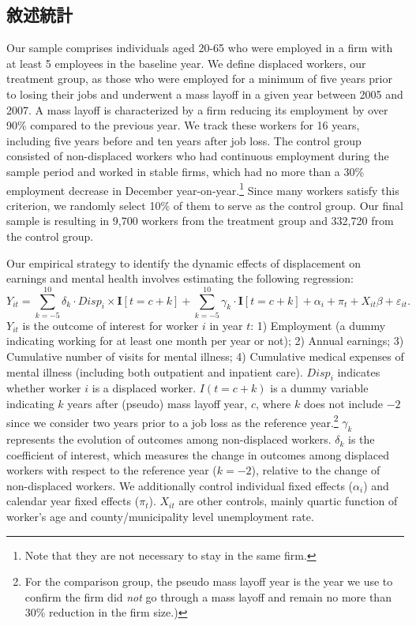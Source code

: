 \documentclass[12pt]{article}
\begin{document}
\subsection{敘述統計}\label{em_strategy}
Our sample comprises individuals aged 20-65 who were employed in a firm with at least 5 employees in the baseline year. We define displaced workers, our treatment group, as those who were employed for a minimum of five years prior to losing their jobs and underwent a mass layoff in a given year between 2005 and 2007. A mass layoff is characterized by a firm reducing its employment by over 90\% compared to the previous year. We track these workers for 16 years, including five years before and ten years after job loss. The control group consisted of non-displaced workers who had continuous employment during the sample period and worked in stable firms, which had no more than a 30\% employment decrease in December year-on-year.\footnote{Note that they are not necessary to stay in the same firm.} Since many workers satisfy this criterion, we randomly select 10\% of them to serve as the control group. Our final sample is resulting in 9,700 workers from the treatment group and 332,720 from the control group.

Our empirical strategy to identify the dynamic effects of displacement on earnings and mental health involves estimating the following regression:
\begin{equation}\label{event}
	Y_{it}= \underset{k = -5}{\overset{10}{\sum }}\delta_{k} \cdot Disp_{i} \times \mathbf{I}[t=c+k] + \underset{k = -5}{\overset{10}{\sum }}\gamma_{k} \cdot \mathbf{I}[t=c+k] 
	+ \alpha_i 
	+ \pi_t
	+ X_{it} \beta
	+\varepsilon_{it}.
\end{equation}
$Y_{it}$ is the outcome of interest for worker $i$ in year $t$: 1) Employment (a dummy indicating working for at least one month per year or not); 2) Annual earnings; 3) Cumulative number of visits for mental illness; 4) Cumulative medical expenses of mental illness (including both outpatient and inpatient care).   $Disp_{i}$ indicates whether worker $i$ is a displaced worker. $I(t=c+k)$ is a dummy variable indicating $k$ years after (pseudo) mass layoff year, $c$, where $k$ does not include $-2$ since we consider two years prior to a job loss as the reference year.\footnote{For the comparison group, the pseudo mass layoff year is the year we use to confirm the firm did {\it not} go through a mass layoff and remain no more than 30\% reduction in the firm size.)} $\gamma_{k}$ represents the evolution of outcomes among non-displaced workers. $\delta_{k}$ is the coefficient of interest, which measures the change in outcomes among displaced workers with respect to the reference year ($k=-2$), relative to the change of non-displaced workers. We additionally control individual fixed effects ($\alpha_i$) and calendar year fixed effects ($\pi_t$). $X_{it}$ are other controls, mainly quartic function of worker's age and county/municipality level unemployment rate.
\end{document}
